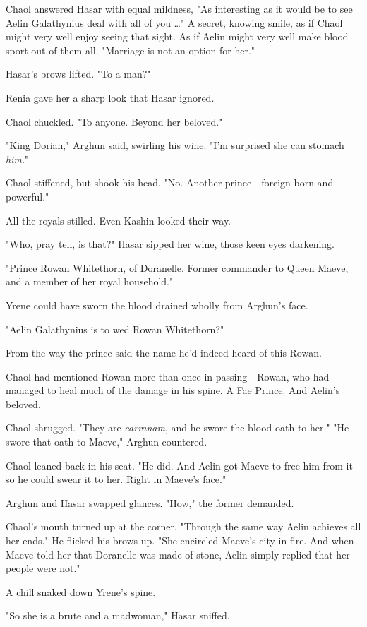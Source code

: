 Chaol answered Hasar with equal mildness, "As interesting as it would be to see Aelin Galathynius deal with all of you \ldots" A secret, knowing smile, as if Chaol might very well enjoy seeing that sight. As if Aelin might very well make blood sport out of them all. "Marriage is not an option for her."

Hasar's brows lifted. "To a man?"

Renia gave her a sharp look that Hasar ignored.

Chaol chuckled. "To anyone. Beyond her beloved."

"King Dorian," Arghun said, swirling his wine. "I'm surprised she can stomach \emph{him}."

Chaol stiffened, but shook his head. "No. Another prince---foreign-born and powerful."

All the royals stilled. Even Kashin looked their way.

"Who, pray tell, is that?" Hasar sipped her wine, those keen eyes darkening.

"Prince Rowan Whitethorn, of Doranelle. Former commander to Queen Maeve, and a member of her royal household."

Yrene could have sworn the blood drained wholly from Arghun's face.

"Aelin Galathynius is to wed Rowan Whitethorn?"

From the way the prince said the name  he'd indeed heard of this Rowan.

Chaol had mentioned Rowan more than once in passing---Rowan, who had managed to heal much of the damage in his spine. A Fae Prince. And Aelin's beloved.

Chaol shrugged. "They are \emph{carranam}, and he swore the blood oath to her." "He swore that oath to Maeve," Arghun countered.

Chaol leaned back in his seat. "He did. And Aelin got Maeve to free him from it so he could swear it to her. Right in Maeve's face."

Arghun and Hasar swapped glances. "How," the former demanded.

Chaol's mouth turned up at the corner. "Through the same way Aelin achieves all her ends." He flicked his brows up. "She encircled Maeve's city in fire. And when Maeve told her that Doranelle was made of stone, Aelin simply replied that her people were not."

A chill snaked down Yrene's spine.

"So she is a brute and a madwoman," Hasar sniffed.

